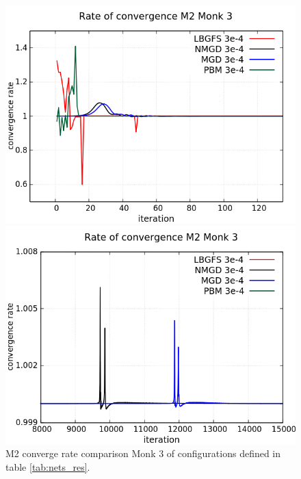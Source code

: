 \begin{figure}[H]
	\centering
	\begin{minipage}[t]{0.525\linewidth}		
		\includegraphics[width=\linewidth]{data/Comparison/Monk3/Monk3_M2_CR_zoomLeft.png}
	\end{minipage}%
	\begin{minipage}[t]{0.525\linewidth}
		\includegraphics[width=\linewidth]{data/Comparison/Monk3/Monk3_M2_CR_zoomRight.png}
	\end{minipage}
	\caption{M2 converge rate comparison Monk 3 of configurations defined in table \ref{tab:nets_res}.}
	\label{fig:CR-M2-Monk3-Zoom}
\end{figure}


